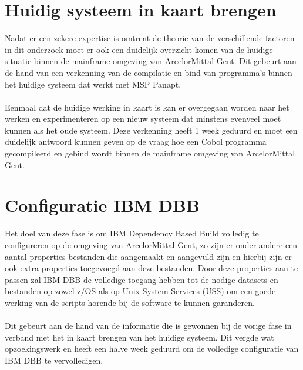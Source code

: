 \section{Huidig systeem in kaart brengen}
\label{sec:huidig systeem}
Nadat er een zekere expertise is omtrent de theorie van de verschillende factoren in dit onderzoek moet er ook een duidelijk overzicht komen van de huidige situatie binnen de mainframe omgeving van ArcelorMittal Gent. Dit gebeurt aan de hand van een verkenning van de compilatie en bind van programma's binnen het huidige systeem dat werkt met MSP Panapt. 
\\ \\ 
Eenmaal dat de huidige werking in kaart is kan er overgegaan worden naar het werken en experimenteren op een nieuw systeem dat minstens evenveel moet kunnen als het oude systeem. Deze verkenning heeft 1 week geduurd en moet een duidelijk antwoord kunnen geven op de vraag hoe een Cobol programma gecompileerd en gebind wordt binnen de mainframe omgeving van ArcelorMittal Gent. 

\section{Configuratie IBM DBB}
\label{sec:configuratie dbb}
Het doel van deze fase is om IBM Dependency Based Build volledig te configureren op de omgeving van ArcelorMittal Gent,
zo zijn er onder andere een aantal properties bestanden die aangemaakt en aangevuld zijn en hierbij zijn er ook extra properties toegevoegd aan deze bestanden.
Door deze properties aan te passen zal IBM DBB de volledige toegang hebben tot de nodige datasets en bestanden op zowel z/OS als op Unix System Services (USS) om een goede werking van de scripts horende bij de software te kunnen garanderen. 
\\ \\
Dit gebeurt aan de hand van de informatie die is gewonnen bij de vorige fase in verband met het in kaart brengen van het huidige systeem. Dit vergde wat opzoekingswerk en heeft een halve week geduurd om de volledige configuratie van IBM DBB te vervolledigen.

